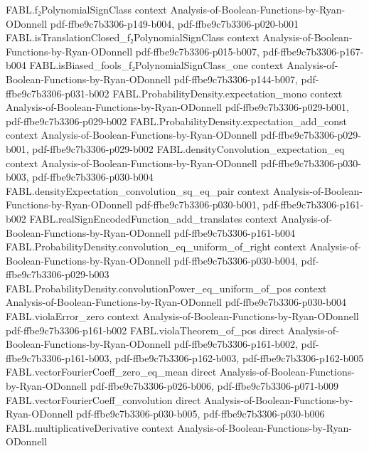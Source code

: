 \begin{theorem}
\proofstep
  {FABL.f₂PolynomialSignClass}
  {context}
  {Analysis-of-Boolean-Functions-by-Ryan-ODonnell}
  {pdf-ffbe9c7b3306-p149-b004,
    pdf-ffbe9c7b3306-p020-b001}
\proofstep
  {FABL.isTranslationClosed_f₂PolynomialSignClass}
  {context}
  {Analysis-of-Boolean-Functions-by-Ryan-ODonnell}
  {pdf-ffbe9c7b3306-p015-b007,
    pdf-ffbe9c7b3306-p167-b004}
\proofstep
  {FABL.isBiased_fools_f₂PolynomialSignClass_one}
  {context}
  {Analysis-of-Boolean-Functions-by-Ryan-ODonnell}
  {pdf-ffbe9c7b3306-p144-b007,
    pdf-ffbe9c7b3306-p031-b002}
\proofstep
  {FABL.ProbabilityDensity.expectation_mono}
  {context}
  {Analysis-of-Boolean-Functions-by-Ryan-ODonnell}
  {pdf-ffbe9c7b3306-p029-b001,
    pdf-ffbe9c7b3306-p029-b002}
\proofstep
  {FABL.ProbabilityDensity.expectation_add_const}
  {context}
  {Analysis-of-Boolean-Functions-by-Ryan-ODonnell}
  {pdf-ffbe9c7b3306-p029-b001,
    pdf-ffbe9c7b3306-p029-b002}
\proofstep
  {FABL.densityConvolution_expectation_eq}
  {context}
  {Analysis-of-Boolean-Functions-by-Ryan-ODonnell}
  {pdf-ffbe9c7b3306-p030-b003,
    pdf-ffbe9c7b3306-p030-b004}
\proofstep
  {FABL.densityExpectation_convolution_sq_eq_pair}
  {context}
  {Analysis-of-Boolean-Functions-by-Ryan-ODonnell}
  {pdf-ffbe9c7b3306-p030-b001,
    pdf-ffbe9c7b3306-p161-b002}
\proofstep
  {FABL.realSignEncodedFunction_add_translates}
  {context}
  {Analysis-of-Boolean-Functions-by-Ryan-ODonnell}
  {pdf-ffbe9c7b3306-p161-b004}
\proofstep
  {FABL.ProbabilityDensity.convolution_eq_uniform_of_right}
  {context}
  {Analysis-of-Boolean-Functions-by-Ryan-ODonnell}
  {pdf-ffbe9c7b3306-p030-b004,
    pdf-ffbe9c7b3306-p029-b003}
\proofstep
  {FABL.ProbabilityDensity.convolutionPower_eq_uniform_of_pos}
  {context}
  {Analysis-of-Boolean-Functions-by-Ryan-ODonnell}
  {pdf-ffbe9c7b3306-p030-b004}
\proofstep
  {FABL.violaError_zero}
  {context}
  {Analysis-of-Boolean-Functions-by-Ryan-ODonnell}
  {pdf-ffbe9c7b3306-p161-b002}
\proofstep
  {FABL.violaTheorem_of_pos}
  {direct}
  {Analysis-of-Boolean-Functions-by-Ryan-ODonnell}
  {pdf-ffbe9c7b3306-p161-b002,
    pdf-ffbe9c7b3306-p161-b003,
    pdf-ffbe9c7b3306-p162-b003,
    pdf-ffbe9c7b3306-p162-b005}
\proofstep
  {FABL.vectorFourierCoeff_zero_eq_mean}
  {direct}
  {Analysis-of-Boolean-Functions-by-Ryan-ODonnell}
  {pdf-ffbe9c7b3306-p026-b006,
    pdf-ffbe9c7b3306-p071-b009}
\proofstep
  {FABL.vectorFourierCoeff_convolution}
  {direct}
  {Analysis-of-Boolean-Functions-by-Ryan-ODonnell}
  {pdf-ffbe9c7b3306-p030-b005,
    pdf-ffbe9c7b3306-p030-b006}
\proofstep
  {FABL.multiplicativeDerivative}
  {context}
  {Analysis-of-Boolean-Functions-by-Ryan-ODonnell}

\end{theorem}
